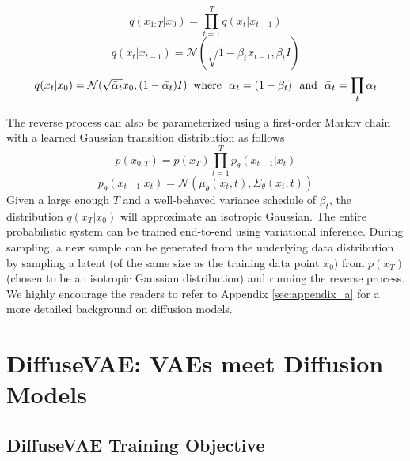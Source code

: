 \documentclass[10pt]{article} \usepackage[accepted]{tmlr}
\begin{document}
\begin{equation}
    q(x_{1:T}|x_0) = \prod_{t=1}^T q(x_t|x_{t-1})
\end{equation}
\begin{equation}
    q(x_t|x_{t-1}) = \mathcal{N}(\sqrt{1 - \beta_t}x_{t-1}, \beta_t I)
\end{equation}
\begin{equation}
    q(x_t|x_0) = \mathcal{N}(\sqrt{\bar{\alpha}_t}x_0, (1 - \bar{\alpha_t})I) \;\;  \textnormal{where} \:\:\: \alpha_t = (1 - \beta_t) \:\:\: \textnormal{and} \:\:\:\bar{\alpha}_t = \prod_t \alpha_t
\end{equation}

The reverse process  can also be parameterized using a first-order Markov chain with a learned Gaussian transition distribution as follows
\begin{equation}
    p(x_{0:T}) = p(x_T)\prod_{t=1}^T p_{\theta}(x_{t-1}|x_t)
\end{equation}
\begin{equation}
    p_{\theta}(x_{t-1}|x_t) = \mathcal{N}(\mu_{\theta}(x_t, t), \Sigma_{\theta}(x_t, t))
\end{equation}
Given a large enough $T$ and a well-behaved variance schedule of $\beta_t$, the distribution $q(x_T|x_0)$ will approximate an isotropic Gaussian. The entire probabilistic system can be trained end-to-end using variational inference. During sampling, a new sample can be generated from the underlying data distribution by sampling a latent (of the same size as the training data point $x_0$) from $p(x_T)$ (chosen to be an isotropic Gaussian distribution) and running the reverse process. We highly encourage the readers to refer to Appendix \ref{sec:appendix_a} for a more detailed background on diffusion models.





\section{DiffuseVAE: VAEs meet Diffusion Models}
\label{sec:DiffuseVAE}

\subsection{DiffuseVAE Training Objective}
\label{subsec:DiffuseVAE_training_objective}
\end{document}
